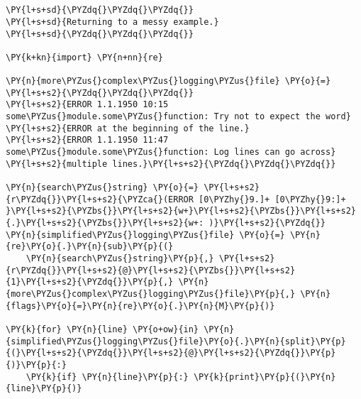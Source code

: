 

\section*{}

\begin{Verbatim}[commandchars=\\\{\}]
\PY{l+s+sd}{\PYZdq{}\PYZdq{}\PYZdq{}}
\PY{l+s+sd}{Returning to a messy example.}
\PY{l+s+sd}{\PYZdq{}\PYZdq{}\PYZdq{}}

\PY{k+kn}{import} \PY{n+nn}{re}

\PY{n}{more\PYZus{}complex\PYZus{}logging\PYZus{}file} \PY{o}{=} \PY{l+s+s2}{\PYZdq{}\PYZdq{}\PYZdq{}}
\PY{l+s+s2}{ERROR 1.1.1950 10:15 some\PYZus{}module.some\PYZus{}function: Try not to expect the word}
\PY{l+s+s2}{ERROR at the beginning of the line.}
\PY{l+s+s2}{ERROR 1.1.1950 11:47 some\PYZus{}module.some\PYZus{}function: Log lines can go across}
\PY{l+s+s2}{multiple lines.}\PY{l+s+s2}{\PYZdq{}\PYZdq{}\PYZdq{}}

\PY{n}{search\PYZus{}string} \PY{o}{=} \PY{l+s+s2}{r\PYZdq{}}\PY{l+s+s2}{\PYZca{}(ERROR [0\PYZhy{}9.]+ [0\PYZhy{}9:]+ }\PY{l+s+s2}{\PYZbs{}}\PY{l+s+s2}{w+}\PY{l+s+s2}{\PYZbs{}}\PY{l+s+s2}{.}\PY{l+s+s2}{\PYZbs{}}\PY{l+s+s2}{w+: )}\PY{l+s+s2}{\PYZdq{}}
\PY{n}{simplified\PYZus{}logging\PYZus{}file} \PY{o}{=} \PY{n}{re}\PY{o}{.}\PY{n}{sub}\PY{p}{(}
    \PY{n}{search\PYZus{}string}\PY{p}{,} \PY{l+s+s2}{r\PYZdq{}}\PY{l+s+s2}{@}\PY{l+s+s2}{\PYZbs{}}\PY{l+s+s2}{1}\PY{l+s+s2}{\PYZdq{}}\PY{p}{,} \PY{n}{more\PYZus{}complex\PYZus{}logging\PYZus{}file}\PY{p}{,} \PY{n}{flags}\PY{o}{=}\PY{n}{re}\PY{o}{.}\PY{n}{M}\PY{p}{)}

\PY{k}{for} \PY{n}{line} \PY{o+ow}{in} \PY{n}{simplified\PYZus{}logging\PYZus{}file}\PY{o}{.}\PY{n}{split}\PY{p}{(}\PY{l+s+s2}{\PYZdq{}}\PY{l+s+s2}{@}\PY{l+s+s2}{\PYZdq{}}\PY{p}{)}\PY{p}{:}
    \PY{k}{if} \PY{n}{line}\PY{p}{:} \PY{k}{print}\PY{p}{(}\PY{n}{line}\PY{p}{)}
\end{Verbatim}

